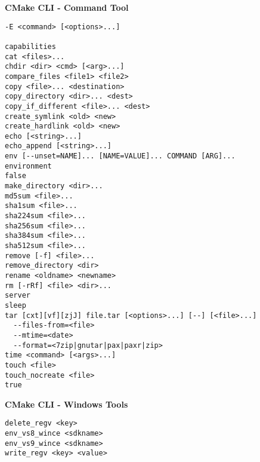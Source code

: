 \documentclass{article}
\begin{document}
\begin{minipage}[t]{0.20\linewidth}
\textbf{CMake CLI - Command Tool}
\begin{verbatim}
-E <command> [<options>...]

capabilities
cat <files>...
chdir <dir> <cmd> [<arg>...]
compare_files <file1> <file2>
copy <file>... <destination>
copy_directory <dir>... <dest>
copy_if_different <file>... <dest>
create_symlink <old> <new>
create_hardlink <old> <new>
echo [<string>...]
echo_append [<string>...]
env [--unset=NAME]... [NAME=VALUE]... COMMAND [ARG]...
environment
false
make_directory <dir>...
md5sum <file>...
sha1sum <file>...
sha224sum <file>...
sha256sum <file>...
sha384sum <file>...
sha512sum <file>...
remove [-f] <file>...
remove_directory <dir>
rename <oldname> <newname>
rm [-rRf] <file> <dir>...
server
sleep
tar [cxt][vf][zjJ] file.tar [<options>...] [--] [<file>...]
  --files-from=<file>
  --mtime=<date>
  --format=<7zip|gnutar|pax|paxr|zip>
time <command> [<args>...]
touch <file>
touch_nocreate <file>
true
\end{verbatim}
\textbf{CMake CLI - Windows Tools}
\begin{verbatim}
delete_regv <key>
env_vs8_wince <sdkname>
env_vs9_wince <sdkname>
write_regv <key> <value>
\end{verbatim}
\hfill\vline\hfill
\end{minipage}

\pagebreak
\end{document}
